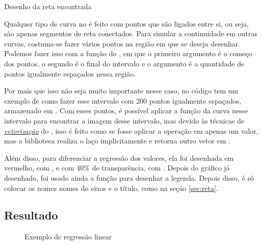     \begin{listing}[H]
        \caption{Desenho da reta encontrada}
        \label{code:regres:plot}

    \end{listing}

    Qualquer tipo de curva no \matplotlib é feito com pontos que são ligados entre si, ou seja, são apenas segmentos de reta conectados. Para simular a continuidade em outras curvas, costuma-se fazer vários pontos na região em que se deseja desenhar. Podemos fazer isso com a função \href{https://docs.scipy.org/doc/numpy/reference/generated/numpy.linspace.html?highlight=linspace#numpy.linspace}{} do \numpy, em que o primeiro argumento é o começo dos pontos, o segundo é o final do intervalo e o argumento  é a quantidade de pontos igualmente espaçados nessa região.

    Por mais que isso não seja muito importante nesse caso, no código tem um exemplo de como fazer esse intervalo com 200 pontos igualmente espaçados, armazenado em . Com esses pontos, é possível aplicar a função da curva nesse intervalo para encontrar a imagem desse intervalo, mas devido às técnicas de \href{https://realpython.com/numpy-array-programming/#what-is-vectorization}{\emph{vetorização}} do \numpy, isso é feito como se fosse aplicar a operação em apenas um valor, mas a biblioteca realiza o laço implicitamente e retorna outro vetor em .

    Além disso, para diferenciar a regressão dos valores, ela foi desenhada em vermelho, com , e com $40\%$ de transparência, com . Depois do gráfico já desenhado, foi usado ainda a função \href{https://matplotlib.org/3.1.0/api/_as_gen/matplotlib.pyplot.legend.html}{} para desenhar a legenda. Depois disso, é só colocar os nomes nomes do eixos e o título, como na seção \ref{sec:reta}.


\subsection{Resultado}

    \begin{figure}[H]
        \centering
        

        \caption{Exemplo de regressão linear}
        \label{fig:regres:resultado}
    \end{figure}
